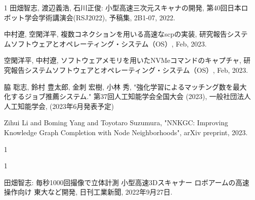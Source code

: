 \begin{発表}{1}
田畑智志, 渡辺義浩, 石川正俊: 小型高速三次元スキャナの開発, 第40回日本ロボット学会学術講演会(RSJ2022), 予稿集, 2B1-07, 2022.



中村遼, 空閑洋平, 複数コネクションを用いる高速なscpの実装, 研究報告システムソフトウェアとオペレーティング・システム（OS）, Feb, 2023.

空閑洋平, 中村遼, ソフトウェアメモリを用いたNVMeコマンドのキャプチャ, 研究報告システムソフトウェアとオペレーティング・システム（OS）, Feb, 2023.



脇 聡志, 鈴村 豊太郎, 金刺 宏樹, 小林 秀, "強化学習によるマッチング数を最大化するジョブ推薦システム." 第37回人工知能学会全国大会 (2023),  一般社団法人 人工知能学会, (2023年6月発表予定)


Zihui Li and Boming Yang and Toyotaro Suzumura, "NNKGC: Improving Knowledge Graph Completion with Node Neighborhoods", arXiv preprint, 2023.

\end{発表}

\begin{特記}{1}


\end{特記}

\begin{報道}{1}


田畑智志: 毎秒1000回撮像で立体計測 小型高速3Dスキャナー ロボアームの高速操作向け 東大など開発, 日刊工業新聞, 2022年9月27日.


\end{報道}
